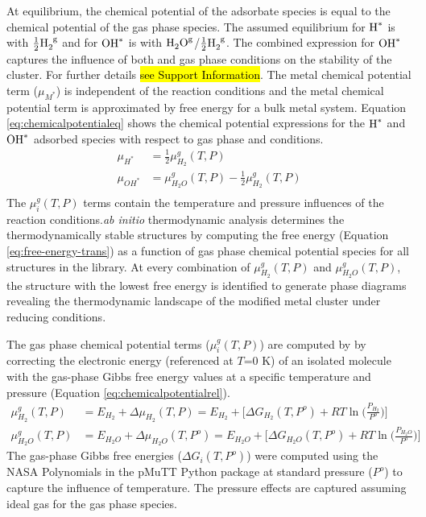 \documentclass[journal=jctcce,manuscript=article]{achemso}
\begin{document}
At equilibrium, the chemical potential of the adsorbate species is equal to the chemical potential of the gas phase species. The assumed equilibrium for $\ce{H^{*}}$ is with $\frac{1}{2}\ce{H_{2}^{g}}$ and for $\ce{OH^{*}}$ is with $\ce{H_{2}O^{g}}$/$\frac{1}{2}\ce{H_{2}^{g}}$. The combined expression for $\ce{OH^{*}}$ captures the influence of both  and  gas phase conditions on the stability of the cluster. For further details \hl{see Support Information}. The metal chemical potential term ($\mu_{M^{*}}$) is independent of the reaction conditions and the metal chemical potential term is approximated by free energy for a bulk metal system. Equation \ref{eq:chemicalpotentialeq} shows the chemical potential expressions for the $\ce{H^{*}}$ and $\ce{OH^{*}}$ adsorbed species with respect to gas phase  and  conditions. 
\begin{equation}
    \begin{split}
        \mu_{H^{*}} &= \frac{1}{2} \mu_{H_{2}}^{g}(T,P) \\ 
        \mu_{OH^{*}} &= \mu_{H_{2}O}^{g}(T,P) - \frac{1}{2} \mu_{H_{2}}^{g}(T,P) \\
    \end{split}
    \label{eq:chemicalpotentialeq}
\end{equation}
The $\mu_{i}^{g}(T,P)$ terms contain the temperature and pressure influences of the reaction conditions.\textit{ab initio} thermodynamic analysis determines the thermodynamically stable structures by computing the free energy (Equation \ref{eq:free-energy-trans}) as a function of gas phase chemical potential species for all structures in the library. At every combination of $\mu_{H_{2}}^{g}(T,P)$ and $\mu_{H_{2}O}^{g}(T,P)$, the structure with the lowest free energy is identified to generate phase diagrams revealing the thermodynamic landscape of the modified metal cluster under reducing conditions. 

The gas phase chemical potential terms ($\mu_{i}^{g}(T,P)$) are computed by by correcting the electronic energy (referenced at $T$=0 K) of an isolated molecule with the gas-phase Gibbs free energy values at a specific temperature and pressure (Equation \ref{eq:chemicalpotentialrel}).
\begin{equation}
    \begin{split}
        \mu_{H_{2}}^{g}(T,P) &= E_{H_2} + \Delta \mu_{H_{2}}(T,P)  = E_{H_{2}} + \Big[ \Delta G_{H_{2}}(T,P^{o}) + RT \ln{\Big( \frac{P_{H_{2}}}{P^{o}} \Big)} \Big] \\  
        \mu_{H_{2}O}^{g}(T,P) &= E_{H_{2}O} + \Delta \mu_{H_{2}O}(T,P^{o}) =  E_{H_{2}O} + \Big[ \Delta G_{H_{2}O}(T,P^{o}) + RT \ln{\Big( \frac{P_{H_{2}O}}{P^{o}} \Big)} \Big]
    \end{split}
    \label{eq:chemicalpotentialrel}
\end{equation}
 The gas-phase Gibbs free energies ($\Delta G_{i}(T,P^{o})$) were computed using the NASA Polynomials\cite{Mcbride1993} in the pMuTT\cite{LYM2019106864} Python package at standard pressure ($P^{o}$) to capture the influence of temperature. The pressure effects are captured assuming ideal gas for the gas phase species. 
 
\end{document}
